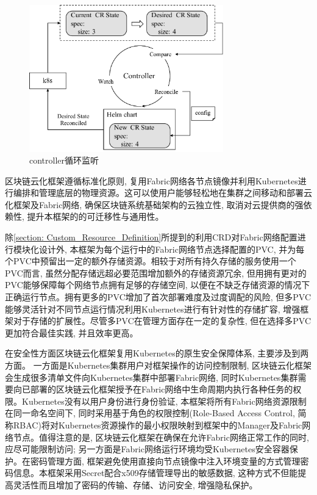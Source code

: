 \begin{figure}[h] %
    \centering %
    \includegraphics[width=0.75\textwidth]{FIGs/chapter4/controller.pdf} %
    \caption{controller循环监听} %
    \label{controller} %
\end{figure}%

区块链云化框架遵循标准化原则, 复用Fabric网络各节点镜像并利用Kubernetes进行编排和管理底层的物理资源。这可以使用户能够轻松地在集群之间移动和部署云化框架及Fabric网络, 确保区块链系统基础架构的云独立性, 取消对云提供商的强依赖性, 提升本框架的的可迁移性与通用性。

除\ref{section: Custom_Resource_Definition}所提到的利用CRD对Fabric网络配置进行模块化设计外, 本框架为每个运行中的Fabric网络节点选择配置的PVC, 并为每个PVC中预留出一定的额外存储资源。相较于对所有持久存储的服务使用一个PVC而言, 虽然分配存储远超必要范围增加额外的存储资源冗余, 但用拥有更对的PVC能够保障每个网络节点拥有足够的存储空间, 以便在不缺乏存储资源的情况下正确运行节点。拥有更多的PVC增加了首次部署难度及过度调配的风险, 但多PVC能够灵活针对不同节点运行情况利用Kubernetes进行有针对性的存储扩容, 增强框架对于存储的扩展性。尽管多PVC在管理方面存在一定的复杂性, 但在选择多PVC更加符合最佳实践, 并且效率更高\cite{d2020design}。

在安全性方面区块链云化框架复用Kubernetes的原生安全保障体系, 主要涉及到两方面。 一方面是Kubernetes集群用户对框架操作的访问控制限制, 区块链云化框架会生成很多清单文件向Kubernetes集群中部署Fabric网络, 同时Kubernetes集群需要向已部署的区块链云化框架授予在Fabric网络中生命周期内执行各种任务的权限。Kubernetes没有以用户身份进行身份验证, 本框架将所有Fabric网络资源限制在同一命名空间下, 同时采用基于角色的权限控制(Role-Based Access Control, 简称RBAC)将对Kubernetes资源操作的最小权限映射到框架中的Manager及Fabric网络节点。值得注意的是, 区块链云化框架在确保在允许Fabric网络正常工作的同时, 应尽可能限制访问; 另一方面是Fabric网络运行环境均受Kubernetes安全容器保护。在密码管理方面, 框架避免使用直接向节点镜像中注入环境变量的方式管理密码信息。本框架采用Secret配合x509\cite{8249485}存储管理导出的敏感数据, 这种方式不但能提高灵活性而且增加了密码的传输、存储、访问安全, 增强隐私保护。


